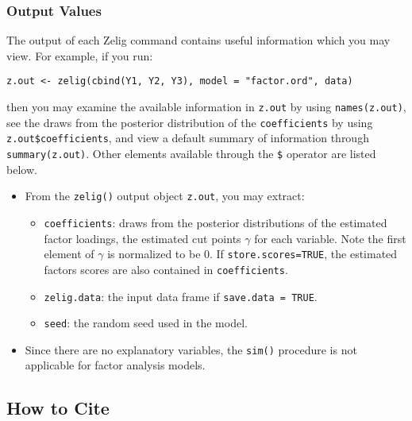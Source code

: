 \subsubsection{Output Values}

The output of each Zelig command contains useful information which you
may view. For example, if you run:
\begin{verbatim}
z.out <- zelig(cbind(Y1, Y2, Y3), model = "factor.ord", data)
\end{verbatim}

\noindent then you may examine the available information in \texttt{z.out} by
using \texttt{names(z.out)}, see the draws from the posterior
distribution of the \texttt{coefficients} by using
\texttt{z.out\$coefficients}, and view a default summary of
information through \texttt{summary(z.out)}. Other elements available
through the \texttt{\$} operator are listed below.

\begin{itemize}
\item From the \texttt{zelig()} output object \texttt{z.out}, you may extract:

\begin{itemize}
\item \texttt{coefficients}: draws from the posterior distributions
of the estimated factor loadings, the estimated cut points $\gamma$ for each
variable. Note the first element of $\gamma$ is normalized to be 0. If 
\texttt{store.scores=TRUE}, the estimated factors scores are also contained in 
\texttt{coefficients}.

   \item {\tt zelig.data}: the input data frame if {\tt save.data = TRUE}.  

\item \texttt{seed}: the random seed used in the model.   

\end{itemize}

\item Since there are no explanatory variables, the \texttt{sim()} procedure is
not applicable for factor analysis models.

\end{itemize}

\subsection* {How to Cite} 



